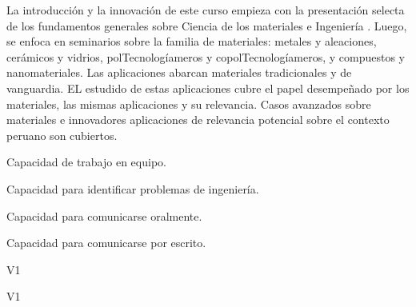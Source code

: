 \begin{syllabus}


\begin{justification}
La introducción y la innovación de este curso empieza con la presentación selecta de los fundamentos generales sobre Ciencia de los materiales e Ingeniería .
Luego, se enfoca en seminarios sobre la familia de materiales: metales y aleaciones, cerámicos y vidrios, polTecnologíameros y copolTecnologíameros, y compuestos y nanomateriales.
Las aplicaciones abarcan materiales tradicionales y de vanguardia. EL estudido de estas aplicaciones cubre el papel desempeñado por los materiales, 
las mismas aplicaciones y su relevancia. Casos avanzados sobre materiales e innovadores aplicaciones de relevancia potencial sobre el contexto peruano son cubiertos.

\end{justification}

\begin{goals}
\item Capacidad de trabajo en equipo.
\item Capacidad para identificar problemas de ingeniería.
\item Capacidad para comunicarse oralmente.
\item Capacidad para comunicarse por escrito.
\end{goals}

\begin{outcomes}{V1}
    \item {}
    \item {}
\end{outcomes}

\begin{competences}{V1}
    \item {}
\end{competences}


\end{syllabus}
